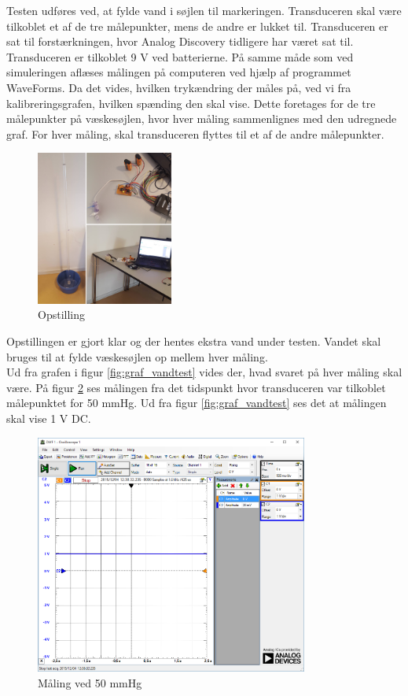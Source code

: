 Testen udføres ved, at fylde vand i søjlen til markeringen. Transduceren skal være tilkoblet et af de tre målepunkter, mens de andre er lukket til. Transduceren er sat til forstærkningen, hvor Analog Discovery tidligere har været sat til. Transduceren er tilkoblet 9 V ved batterierne. På samme måde som ved simuleringen aflæses målingen på computeren ved hjælp af programmet WaveForms. Da det vides, hvilken trykændring der måles på, ved vi fra kalibreringsgrafen, hvilken spænding den skal vise. Dette foretages for de tre målepunkter på væskesøjlen, hvor hver måling sammenlignes med den udregnede graf. For hver måling, skal transduceren flyttes til et af de andre målepunkter.  

\begin{figure}[H]
	\centering
	\includegraphics[width=0.4\textwidth]{Figurer/vandtest_opstilling}
	\caption{Opstilling}
	\label{fig:vandtest_opstilling}
\end{figure} 
Opstillingen er gjort klar og der hentes ekstra vand under testen. Vandet skal bruges til at fylde væskesøjlen op mellem hver måling. \\
Ud fra grafen i figur \ref{fig:graf_vandtest} vides der, hvad svaret på hver måling skal være. På figur \ref{fig:vandtest_måling50} ses målingen fra det tidspunkt hvor transduceren var tilkoblet målepunktet for 50 mmHg. Ud fra figur \ref{fig:graf_vandtest} ses det at målingen skal vise 1 V DC.  
\begin{figure}[H]
	\centering	\includegraphics[width=0.8\textwidth]{Figurer/50mmhg}
	\caption{Måling ved 50 mmHg}
	\label{fig:vandtest_måling50}
\end{figure}
 
